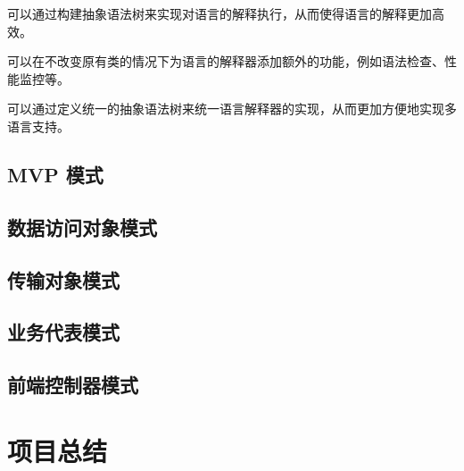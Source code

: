\documentclass[cn,black,12pt,normal]{elegantnote}
\begin{document}
可以通过构建抽象语法树来实现对语言的解释执行，从而使得语言的解释更加高效。

可以在不改变原有类的情况下为语言的解释器添加额外的功能，例如语法检查、性能监控等。

可以通过定义统一的抽象语法树来统一语言解释器的实现，从而更加方便地实现多语言支持。




\subsection{MVP 模式}

\subsection{数据访问对象模式}

\subsection{传输对象模式}

\subsection{业务代表模式}

\subsection{前端控制器模式}

\section{项目总结}






\end{document}
